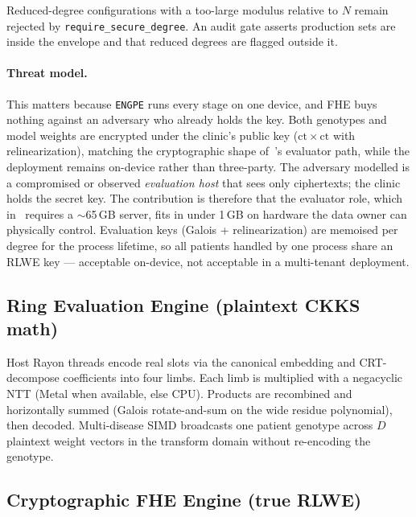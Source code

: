 \documentclass[11pt,a4paper]{article}
\newcommand{\engpe}{\texttt{ENGPE}}
\DeclareRobustCommand{\code}[1]{\texttt{#1}}
\begin{document}
Reduced-degree configurations with a too-large modulus relative to $N$ remain
rejected by \code{require\_secure\_degree}. An audit gate asserts production sets
are inside the envelope and that reduced degrees are flagged outside it.

\paragraph{Threat model.}
This matters because \engpe{} runs every stage on one device, and FHE buys nothing
against an adversary who already holds the key. Both genotypes and model weights
are encrypted under the clinic's public key ($\mathrm{ct}\times\mathrm{ct}$ with
relinearization), matching the cryptographic shape of~\cite{knight2026heprs}'s
evaluator path, while the deployment remains on-device rather than three-party. The
adversary modelled is a compromised or observed \textit{evaluation host} that sees
only ciphertexts; the clinic holds the secret key. The contribution is therefore
that the evaluator role, which in~\cite{knight2026heprs} requires a $\sim$65\,GB
server, fits in under 1\,GB on hardware the data owner can physically control.
Evaluation keys (Galois + relinearization) are memoised per degree for the process
lifetime, so all patients handled by one process share an RLWE key --- acceptable
on-device, not acceptable in a multi-tenant deployment.

\subsection{Ring Evaluation Engine (plaintext CKKS math)}
\label{sec:ring}

Host Rayon threads encode real slots via the canonical embedding and
CRT-decompose coefficients into four limbs. Each limb is multiplied with a
negacyclic NTT (Metal when available, else CPU). Products are recombined and
horizontally summed (Galois rotate-and-sum on the wide residue polynomial), then
decoded. Multi-disease SIMD broadcasts one patient genotype across $D$ plaintext
weight vectors in the transform domain without re-encoding the genotype.

\subsection{Cryptographic FHE Engine (true RLWE)}
\label{sec:fhe}
\end{document}
